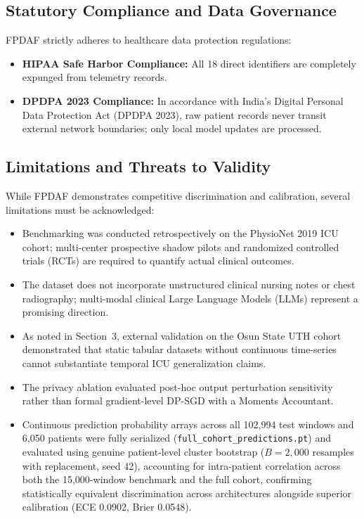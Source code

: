 \documentclass[10pt,a4paper,twocolumn,twoside]{article}
\begin{document}
\subsection{Statutory Compliance and Data Governance}
FPDAF strictly adheres to healthcare data protection regulations:
\begin{itemize}
    \item \textbf{HIPAA Safe Harbor Compliance:} All 18 direct identifiers are completely expunged from telemetry records.
    \item \textbf{DPDPA 2023 Compliance:} In accordance with India's Digital Personal Data Protection Act (DPDPA 2023), raw patient records never transit external network boundaries; only local model updates are processed.
\end{itemize}

\subsection{Limitations and Threats to Validity}
While FPDAF demonstrates competitive discrimination and calibration, several limitations must be acknowledged:
\begin{itemize}
    \item Benchmarking was conducted retrospectively on the PhysioNet 2019 ICU cohort; multi-center prospective shadow pilots and randomized controlled trials (RCTs) are required to quantify actual clinical outcomes.
    \item The dataset does not incorporate unstructured clinical nursing notes or chest radiography; multi-modal clinical Large Language Models (LLMs) represent a promising direction.
    \item As noted in Section~3, external validation on the Osun State UTH cohort demonstrated that static tabular datasets without continuous time-series cannot substantiate temporal ICU generalization claims.
    \item The privacy ablation evaluated post-hoc output perturbation sensitivity rather than formal gradient-level DP-SGD with a Moments Accountant.
    \item Continuous prediction probability arrays across all 102,994 test windows and 6,050 patients were fully serialized (\texttt{full\_cohort\_predictions.pt}) and evaluated using genuine patient-level cluster bootstrap ($B=2,000$ resamples with replacement, seed 42), accounting for intra-patient correlation across both the 15,000-window benchmark and the full cohort, confirming statistically equivalent discrimination across architectures alongside superior calibration (ECE 0.0902, Brier 0.0548).
\end{itemize}
\end{document}
